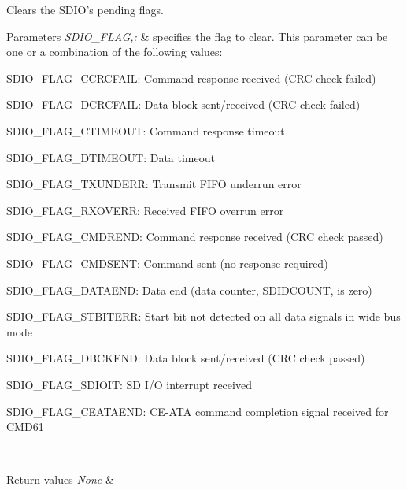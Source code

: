 Clears the S\-D\-I\-O's pending flags. 


\begin{DoxyParams}{Parameters}
{\em S\-D\-I\-O\-\_\-\-F\-L\-A\-G,\-:} & specifies the flag to clear. This parameter can be one or a combination of the following values\-: \begin{DoxyItemize}
\item S\-D\-I\-O\-\_\-\-F\-L\-A\-G\-\_\-\-C\-C\-R\-C\-F\-A\-I\-L\-: Command response received (C\-R\-C check failed) \item S\-D\-I\-O\-\_\-\-F\-L\-A\-G\-\_\-\-D\-C\-R\-C\-F\-A\-I\-L\-: Data block sent/received (C\-R\-C check failed) \item S\-D\-I\-O\-\_\-\-F\-L\-A\-G\-\_\-\-C\-T\-I\-M\-E\-O\-U\-T\-: Command response timeout \item S\-D\-I\-O\-\_\-\-F\-L\-A\-G\-\_\-\-D\-T\-I\-M\-E\-O\-U\-T\-: Data timeout \item S\-D\-I\-O\-\_\-\-F\-L\-A\-G\-\_\-\-T\-X\-U\-N\-D\-E\-R\-R\-: Transmit F\-I\-F\-O underrun error \item S\-D\-I\-O\-\_\-\-F\-L\-A\-G\-\_\-\-R\-X\-O\-V\-E\-R\-R\-: Received F\-I\-F\-O overrun error \item S\-D\-I\-O\-\_\-\-F\-L\-A\-G\-\_\-\-C\-M\-D\-R\-E\-N\-D\-: Command response received (C\-R\-C check passed) \item S\-D\-I\-O\-\_\-\-F\-L\-A\-G\-\_\-\-C\-M\-D\-S\-E\-N\-T\-: Command sent (no response required) \item S\-D\-I\-O\-\_\-\-F\-L\-A\-G\-\_\-\-D\-A\-T\-A\-E\-N\-D\-: Data end (data counter, S\-D\-I\-D\-C\-O\-U\-N\-T, is zero) \item S\-D\-I\-O\-\_\-\-F\-L\-A\-G\-\_\-\-S\-T\-B\-I\-T\-E\-R\-R\-: Start bit not detected on all data signals in wide bus mode \item S\-D\-I\-O\-\_\-\-F\-L\-A\-G\-\_\-\-D\-B\-C\-K\-E\-N\-D\-: Data block sent/received (C\-R\-C check passed) \item S\-D\-I\-O\-\_\-\-F\-L\-A\-G\-\_\-\-S\-D\-I\-O\-I\-T\-: S\-D I/\-O interrupt received \item S\-D\-I\-O\-\_\-\-F\-L\-A\-G\-\_\-\-C\-E\-A\-T\-A\-E\-N\-D\-: C\-E-\/\-A\-T\-A command completion signal received for C\-M\-D61 \end{DoxyItemize}
\\
\hline
\end{DoxyParams}

\begin{DoxyRetVals}{Return values}
{\em None} & \\
\hline
\end{DoxyRetVals}


